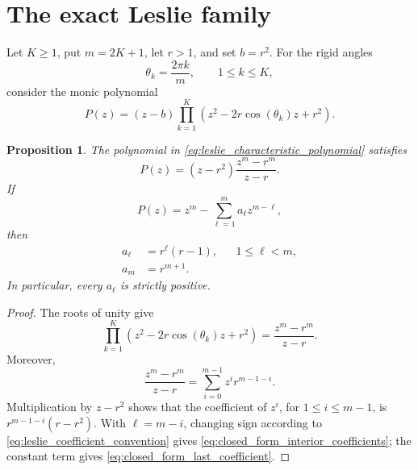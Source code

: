 \documentclass[11pt]{amsart}
\numberwithin{equation}{section}
\theoremstyle{plain}
\newtheorem{proposition}[theorem]{Proposition}
\theoremstyle{definition}
\theoremstyle{remark}
\begin{document}
\section{The exact Leslie family}
\label{sec:exact_leslie_family}

Let $K\geq1$, put $m=2K+1$, let $r>1$, and set $b=r^2$.  For the rigid angles
\begin{equation}
\theta_k=\frac{2\pi k}{m},\qquad 1\leq k\leq K,
\label{eq:root_unity_angles}
\end{equation}
consider the monic polynomial
\begin{equation}
P(z)=(z-b)\prod_{k=1}^{K}
\left(z^2-2r\cos(\theta_k)z+r^2\right).
\label{eq:leslie_characteristic_polynomial}
\end{equation}

\begin{proposition}
\label{prop:closed_form_family}
The polynomial in \eqref{eq:leslie_characteristic_polynomial} satisfies
\begin{equation}
P(z)=(z-r^2)\frac{z^m-r^m}{z-r}.
\label{eq:closed_form_polynomial}
\end{equation}
If
\begin{equation}
P(z)=z^m-\sum_{\ell=1}^{m}a_\ell z^{m-\ell},
\label{eq:leslie_coefficient_convention}
\end{equation}
then
\begin{align}
a_\ell&=r^\ell(r-1), &&1\leq\ell<m,
\label{eq:closed_form_interior_coefficients}\\
a_m&=r^{m+1}.
\label{eq:closed_form_last_coefficient}
\end{align}
In particular, every $a_\ell$ is strictly positive.
\end{proposition}

\begin{proof}
The roots of unity give
\begin{equation}
\prod_{k=1}^{K}
\left(z^2-2r\cos(\theta_k)z+r^2\right)
=\frac{z^m-r^m}{z-r}.
\label{eq:roots_unity_product}
\end{equation}
Moreover,
\begin{equation}
\frac{z^m-r^m}{z-r}=\sum_{i=0}^{m-1}z^i r^{m-1-i}.
\label{eq:geometric_polynomial_sum}
\end{equation}
Multiplication by $z-r^2$ shows that the coefficient of $z^i$, for $1\leq i\leq m-1$, is $r^{m-1-i}(r-r^2)$.  With $\ell=m-i$, changing sign according to \eqref{eq:leslie_coefficient_convention} gives \eqref{eq:closed_form_interior_coefficients}; the constant term gives \eqref{eq:closed_form_last_coefficient}.
\end{proof}
\end{document}
